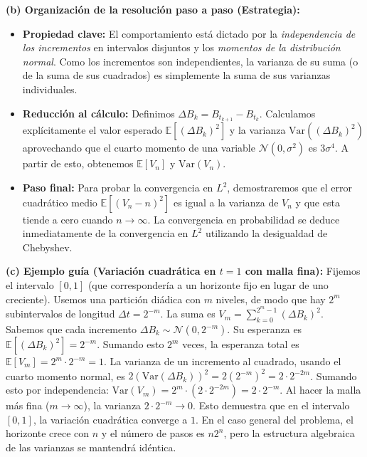 \documentclass[11pt, letterpaper]{article}
\begin{document}
\begin{solucion}
    \textbf{(b) Organización de la resolución paso a paso (Estrategia):}
    \begin{itemize}
        \item[(i)] \textbf{Propiedad clave:} El comportamiento está dictado por la \textit{independencia de los incrementos} en intervalos disjuntos y los \textit{momentos de la distribución normal}. Como los incrementos son independientes, la varianza de su suma (o de la suma de sus cuadrados) es simplemente la suma de sus varianzas individuales.
        \item[(ii)] \textbf{Reducción al cálculo:} Definimos $\Delta B_k = B_{t_{k+1}} - B_{t_k}$. Calculamos explícitamente el valor esperado $\mathbb{E}[(\Delta B_k)^2]$ y la varianza $\text{Var}((\Delta B_k)^2)$ aprovechando que el cuarto momento de una variable $\mathcal{N}(0, \sigma^2)$ es $3\sigma^4$. A partir de esto, obtenemos $\mathbb{E}[V_n]$ y $\text{Var}(V_n)$.
        \item[(iii)] \textbf{Paso final:} Para probar la convergencia en $L^2$, demostraremos que el error cuadrático medio $\mathbb{E}[(V_n - n)^2]$ es igual a la varianza de $V_n$ y que esta tiende a cero cuando $n \to \infty$. La convergencia en probabilidad se deduce inmediatamente de la convergencia en $L^2$ utilizando la desigualdad de Chebyshev.
    \end{itemize}

    \vspace{3mm}
    \textbf{(c) Ejemplo guía (Variación cuadrática en $t=1$ con malla fina):}
    Fijemos el intervalo $[0, 1]$ (que correspondería a un horizonte fijo en lugar de uno creciente). Usemos una partición diádica con $m$ niveles, de modo que hay $2^m$ subintervalos de longitud $\Delta t = 2^{-m}$.
    La suma es $V_m = \sum_{k=0}^{2^m-1} (\Delta B_k)^2$.
    Sabemos que cada incremento $\Delta B_k \sim \mathcal{N}(0, 2^{-m})$.
    Su esperanza es $\mathbb{E}[(\Delta B_k)^2] = 2^{-m}$.
    Sumando esto $2^m$ veces, la esperanza total es $\mathbb{E}[V_m] = 2^m \cdot 2^{-m} = 1$.
    La varianza de un incremento al cuadrado, usando el cuarto momento normal, es $2(\text{Var}(\Delta B_k))^2 = 2(2^{-m})^2 = 2 \cdot 2^{-2m}$.
    Sumando esto por independencia: $\text{Var}(V_m) = 2^m \cdot (2 \cdot 2^{-2m}) = 2 \cdot 2^{-m}$.
    Al hacer la malla más fina ($m \to \infty$), la varianza $2 \cdot 2^{-m} \to 0$. Esto demuestra que en el intervalo $[0,1]$, la variación cuadrática converge a $1$. En el caso general del problema, el horizonte crece con $n$ y el número de pasos es $n2^n$, pero la estructura algebraica de las varianzas se mantendrá idéntica.


\end{solucion}
\end{document}
